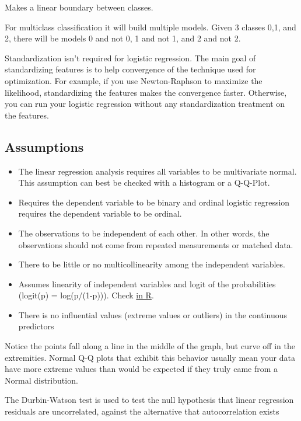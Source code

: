 \documentclass[]{book}
\theoremstyle{definition}
\theoremstyle{definition}
\theoremstyle{definition}
\theoremstyle{remark}
\begin{document}
Makes a linear boundary between classes.

For multiclass classification it will build multiple models. Given 3
classes 0,1, and 2, there will be models 0 and not 0, 1 and not 1, and 2
and not 2.

Standardization isn't required for logistic regression. The main goal of
standardizing features is to help convergence of the technique used for
optimization. For example, if you use Newton-Raphson to maximize the
likelihood, standardizing the features makes the convergence faster.
Otherwise, you can run your logistic regression without any
standardization treatment on the features.

\subsection{Assumptions}\label{assumptions-2}

\begin{itemize}
\item
  The linear regression analysis requires all variables to be
  multivariate normal. This assumption can best be checked with a
  histogram or a Q-Q-Plot.
\item
  Requires the dependent variable to be binary and ordinal logistic
  regression requires the dependent variable to be ordinal.
\item
  The observations to be independent of each other. In other words, the
  observations should not come from repeated measurements or matched
  data.
\item
  There to be little or no multicollinearity among the independent
  variables.
\item
  Assumes linearity of independent variables and logit of the
  probabilities (logit(p) = log(p/(1-p))). Check
  \href{https://stats.stackexchange.com/questions/169348/how-should-i-check-the-assumption-of-linearity-to-the-logit-for-the-continuous-i}{in
  R}.
\item
  There is no influential values (extreme values or outliers) in the
  continuous predictors
\end{itemize}

Notice the points fall along a line in the middle of the graph, but
curve off in the extremities. Normal Q-Q plots that exhibit this
behavior usually mean your data have more extreme values than would be
expected if they truly came from a Normal distribution.

The Durbin-Watson test is used to test the null hypothesis that linear
regression residuals are uncorrelated, against the alternative that
autocorrelation exists
\end{document}
